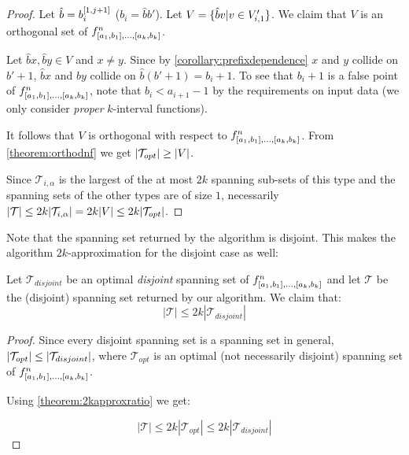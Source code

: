 \begin{proof}
Let $\hat{b} = b_i^{[1, j+1]}$ ($b_i = \hat{b} b'$).
Let $V = \{\hat{b} v | v \in V_{i, 1}'\}$.
We claim that $V$ is an orthogonal set of
$f^{n}_{[a_1, b_1], \ldots, [a_{k}, b_{k}]}$.

Let $\hat{b} x, \hat{b} y \in V$
and $x \neq y$.
Since by \cref{corollary:prefixdependence}
$x$ and $y$ collide on $b'+1$,
$\hat{b} x$ and $\hat{b} y$
collide on
$\hat{b} (b'+1) = b_i+1$.
To see that $b_i+1$ is a false point of $f^{n}_{[a_1, b_1], \ldots, [a_{k}, b_{k}]}$,
note that $b_i < a_{i+1} - 1$
by the requirements on input data
(we only consider \emph{proper} $k$-interval functions).

It follows that $V$ is orthogonal
with respect to $f^{n}_{[a_1, b_1], \ldots, [a_{k}, b_{k}]}$.
From \autoref{theorem:orthodnf} we get
$\lvert\mathcal{T}_{opt}\rvert \geq \lvert V\rvert$.

Since $\mathcal{T}_{i, \alpha}$ is
the largest of the at most $2k$ spanning sub-sets
of this type
and the spanning sets of the other types are of size $1$,
necessarily
$\lvert\mathcal{T}\rvert \leq 2k \lvert\mathcal{T}_{i, \alpha}\rvert
= 2k \lvert V\rvert \leq 2k \lvert\mathcal{T}_{opt}\rvert$.
\end{proof}

Note that the spanning set returned by the algorithm
is disjoint.
This makes the algorithm $2k$-approximation
for the disjoint case as well:

\begin{theorem}
Let $\mathcal{T}_{disjoint}$ be an optimal \emph{disjoint}
spanning set of
$f^n_{[a_1, b_1], \ldots, [a_k, b_k]}$
and let $\mathcal{T}$ be the (disjoint)
spanning set returned by our algorithm.
We claim that:
\begin{equation*}
|\mathcal{T}| \leq 2k |\mathcal{T}_{disjoint}|
\end{equation*}
\end{theorem}

\begin{proof}
Since every disjoint spanning set
is a spanning set in general,
$\lvert\mathcal{T}_{opt}\rvert \leq
\lvert\mathcal{T}_{disjoint}\rvert$,
where $\mathcal{T}_{opt}$ is an optimal
(not necessarily disjoint)
spanning set of
$f^n_{[a_1, b_1], \ldots, [a_k, b_k]}$.

Using \autoref{theorem:2kapproxratio} we get:

\begin{equation*}
|\mathcal{T}| \leq 2k |\mathcal{T}_{opt}|
\leq 2k |\mathcal{T}_{disjoint}|
\end{equation*}
\end{proof}


